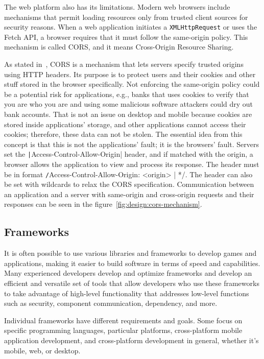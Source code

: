 The web platform also has its limitations.
Modern web browsers include mechanisms that permit loading resources only from trusted client sources for security reasons.
When a web application initiates a \texttt{XMLHttpRequest} or uses the Fetch API, a browser requires that it must follow the same-origin policy.
This mechanism is called CORS, and it means Cross-Origin Resource Sharing.

As stated in~\cite{a2022_crossorigin}, CORS is a mechanism that lets servers specify trusted origins using HTTP headers.
Its purpose is to protect users and their cookies and other stuff stored in the browser specifically.
Not enforcing the same-origin policy could be a potential risk for applications, e.g., banks that uses cookies to verify that you are who you are and using some malicious software attackers could dry out bank accounts.
That is not an issue on desktop and mobile because cookies are stored inside applications' storage, and other applications cannot access their cookies; therefore, these data can not be stolen.
The essential idea from this concept is that this is not the applications' fault; it is the browsers' fault.
Servers set the \texttt|Access-Control-Allow-Origin| header, and if matched with the origin, a browser allows the application to view and process its response. The header must be in format \texttt/Access-Control-Allow-Origin: <origin> | */.
The header can also be set with wildcards to relax the CORS specification.
Communication between an application and a server with same-origin and cross-origin requests and their responses can be seen in the figure~\ref{fig:design:cors-mechanism}.

\subsection{Frameworks}

It is often possible to use various libraries and frameworks to develop games and applications, making it easier to build software in terms of speed and capabilities.
Many experienced developers develop and optimize frameworks and develop an efficient and versatile set of tools that allow developers who use these frameworks to take advantage of high-level functionality that addresses low-level functions such as security, component communication, dependency, and more.

Individual frameworks have different requirements and goals.
Some focus on specific programming languages, particular platforms, cross-platform mobile application development, and cross-platform development in general, whether it's mobile, web, or desktop.

